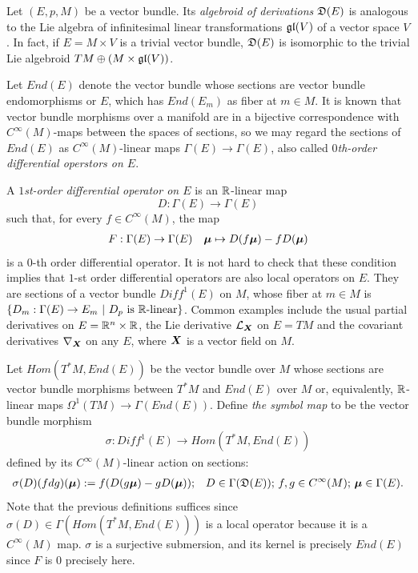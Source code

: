 


Let $(E, p, M)$ be a vector bundle. Its \emph{algebroid of derivations} $\mathfrak{D}(E)$ is analogous to the Lie algebra of infinitesimal linear transformations $\mathfrak{gl}(V)$ of a vector space $V$. In fact, if $E = M \times V$ is a trivial vector bundle, $\mathfrak{D}(E)$ is isomorphic to the trivial Lie algebroid $TM \oplus (M \times \mathfrak{gl}(V))$.

Let $End(E)$ denote the vector bundle whose sections are vector bundle endomorphisms or $E$, which has $End(E_m)$ as fiber at $m \in M$. It is known that vector bundle morphisms over a manifold are in a bijective correspondence with $C^\infty(M)$-maps between the spaces of sections, so we may regard the sections of $End(E)$ as $C^\infty(M)$-linear maps $\Gamma(E) \to \Gamma(E)$, also called \emph{$0$th-order differential operstors on $E$}.

A \emph{$1$st-order differential operator on $E$} is an $\mathbb{R}$-linear map 
\[
    D: \Gamma(E) \to \Gamma(E)
\]
such that, for every $f \in C^\infty(M)$, the map
\begin{align*}
    F: \Gamma(E) \to \Gamma(E) && \bm{\mu} \mapsto D(f \bm{\mu}) - f D(\bm{\mu})
\end{align*}
is a $0$-th order differential operator. It is not hard to check that these condition implies that $1$-st order differential operators are also local operators on $E$. They are sections of a vector bundle $Diff^1(E)$ on $M$, whose fiber at $m \in M$ is $\left\{ D_m: \Gamma(E) \to E_m \ |\  D_p \textrm{ is $\mathbb{R}$-linear} \right\}$. Common examples include the usual partial derivatives on $E = \mathbb{R}^n \times \mathbb{R}$, the Lie derivative $\mathcal L_{\bm{X}}$ on $E = TM$ and the covariant derivatives $\nabla_{\bm{X}}$ on any $E$, where $\bm{X}$ is a vector field on $M$.

Let $Hom(T^*M, End(E))$ be the vector bundle over $M$ whose sections are vector bundle morphisms between $T^* M$ and $End(E)$ over $M$ or, equivalently, $\mathbb{R}$-linear maps $\Omega^1(TM) \to \Gamma(End(E))$. Define \emph{the symbol map} to be the vector bundle morphism
\begin{align*}
    \sigma: Diff^1(E) \to Hom(T^*M, End(E)) 
\end{align*}
defined by its $C^\infty(M)$-linear action on sections:
\begin{align*}
    \sigma(D)(fdg)(\bm{\mu}) := f (D(g \bm{\mu}) - g D(\bm{\mu})); && D \in \Gamma(\mathfrak{D}(E));\, f, g \in C^\infty(M);\, \bm{\mu} \in \Gamma(E).
\end{align*}
Note that the previous definitions suffices since $\sigma(D) \in \Gamma(Hom(T^*M, End(E)))$ is a local operator because it is a $C^\infty(M)$ map. $\sigma$ is a surjective submersion, and its kernel is precisely $End(E)$ since $F$ is $0$ precisely here.

